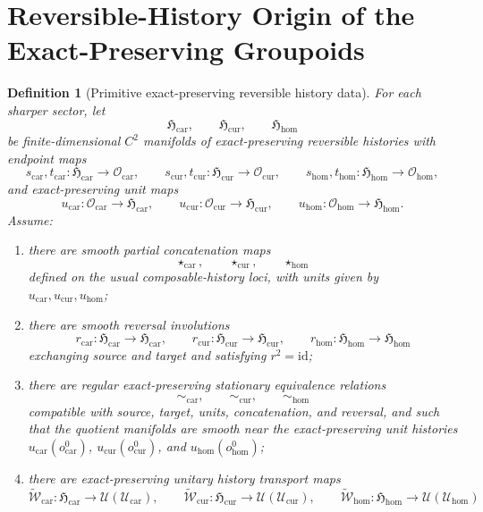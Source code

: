 \documentclass[11pt]{article}
\newcommand{\RootTensorClass}{\mathscr U_{\mathrm{car}}}
\newcommand{\RootRelabelClass}{\mathscr U_{\mathrm{cur}}}
\newcommand{\RootFreeClass}{\mathscr U_{\mathrm{hom}}}
\newcommand{\TensorObjClass}{\mathcal O_{\mathrm{car}}}
\newcommand{\CurObjClass}{\mathcal O_{\mathrm{cur}}}
\newcommand{\HomObjClass}{\mathcal O_{\mathrm{hom}}}
\newcommand{\TensorObjBase}{o_{\mathrm{car}}^0}
\newcommand{\CurObjBase}{o_{\mathrm{cur}}^0}
\newcommand{\HomObjBase}{o_{\mathrm{hom}}^0}
\newcommand{\TensorHistoryClass}{\mathfrak H_{\mathrm{car}}}
\newcommand{\CurHistoryClass}{\mathfrak H_{\mathrm{cur}}}
\newcommand{\HomHistoryClass}{\mathfrak H_{\mathrm{hom}}}
\newcommand{\TensorHistoryRep}{\widetilde{\mathscr W}_{\mathrm{car}}}
\newcommand{\CurHistoryRep}{\widetilde{\mathscr W}_{\mathrm{cur}}}
\newcommand{\HomHistoryRep}{\widetilde{\mathscr W}_{\mathrm{hom}}}
\newtheorem{definition}{Definition}
\begin{document}
\section{Reversible-History Origin of the Exact-Preserving Groupoids}

\begin{definition}[Primitive exact-preserving reversible history data]
\label{def:primitive_history_groupoid}
For each sharper sector, let
\[
\TensorHistoryClass,\qquad
\CurHistoryClass,\qquad
\HomHistoryClass
\]
be finite-dimensional \(C^2\) manifolds of exact-preserving reversible histories with endpoint maps
\[
s_{\mathrm{car}},t_{\mathrm{car}}:\TensorHistoryClass\to\TensorObjClass,
\qquad
s_{\mathrm{cur}},t_{\mathrm{cur}}:\CurHistoryClass\to\CurObjClass,
\qquad
s_{\mathrm{hom}},t_{\mathrm{hom}}:\HomHistoryClass\to\HomObjClass,
\]
and exact-preserving unit maps
\[
u_{\mathrm{car}}:\TensorObjClass\to\TensorHistoryClass,\qquad
u_{\mathrm{cur}}:\CurObjClass\to\CurHistoryClass,\qquad
u_{\mathrm{hom}}:\HomObjClass\to\HomHistoryClass.
\]
Assume:
\begin{enumerate}
    \item there are smooth partial concatenation maps
    \[
    \star_{\mathrm{car}},\qquad
    \star_{\mathrm{cur}},\qquad
    \star_{\mathrm{hom}}
    \]
    defined on the usual composable-history loci, with units given by \(u_{\mathrm{car}},u_{\mathrm{cur}},u_{\mathrm{hom}}\);
    \item there are smooth reversal involutions
    \[
    r_{\mathrm{car}}:\TensorHistoryClass\to\TensorHistoryClass,\qquad
    r_{\mathrm{cur}}:\CurHistoryClass\to\CurHistoryClass,\qquad
    r_{\mathrm{hom}}:\HomHistoryClass\to\HomHistoryClass
    \]
    exchanging source and target and satisfying \(r^2=\mathrm{id}\);
    \item there are regular exact-preserving stationary equivalence relations
    \[
    \sim_{\mathrm{car}},\qquad
    \sim_{\mathrm{cur}},\qquad
    \sim_{\mathrm{hom}}
    \]
    compatible with source, target, units, concatenation, and reversal, and such that the quotient manifolds are smooth near the exact-preserving unit histories \(u_{\mathrm{car}}(\TensorObjBase)\), \(u_{\mathrm{cur}}(\CurObjBase)\), and \(u_{\mathrm{hom}}(\HomObjBase)\);
    \item there are exact-preserving unitary history transport maps
    \[
    \TensorHistoryRep:\TensorHistoryClass\to\mathcal U(\RootTensorClass),\qquad
    \CurHistoryRep:\CurHistoryClass\to\mathcal U(\RootRelabelClass),\qquad
    \HomHistoryRep:\HomHistoryClass\to\mathcal U(\RootFreeClass)
\]
\end{enumerate}
\end{definition}
\end{document}

